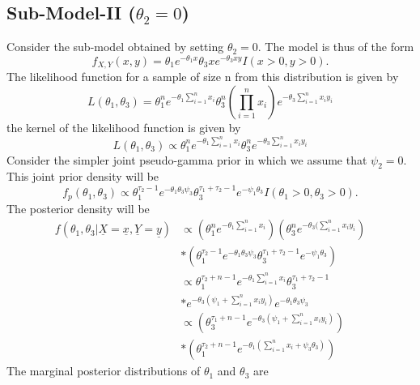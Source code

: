 \documentclass[12pt]{article}    %
\numberwithin{equation}{section}
\begin{document}
\subsection{Sub-Model-II ($\theta_2=0$)}
Consider the sub-model obtained by setting $\theta_2=0$. The model is thus of the form
\begin{equation*}
f_{X,Y}(x,y) = \theta_1e^{-\theta_1x}\theta_3xe^{-\theta_3xy}I(x>0,y>0).
\end{equation*}
The likelihood function for a sample of size n from this distribution is given by
\begin{equation*}
L(\theta_1, \theta_3) = \theta_1^n e^{-\theta_1\sum^n_{i=1}x_i}\theta_3^n(\prod^n_{i=1}x_i) e^{-\theta_3\sum^n_{i=1}x_iy_i}
\end{equation*}
the kernel of the likelihood function is given by
\begin{equation}\label{eq30}
L(\theta_1, \theta_3) \propto \theta_1^n e^{-\theta_1\sum^n_{i=1}x_i}\theta_3^ne^{-\theta_3\sum^n_{i=1}x_iy_i}
\end{equation}
Consider the simpler joint pseudo-gamma prior in which we assume that $\psi_2=0$. This joint prior density will be
\begin{equation}\label{eq31}
f_p(\theta_1, \theta_3) \propto \theta_1^{\tau_2-1}e^{-\theta_1\theta_3\psi_3}\theta_3^{\tau_1+\tau_2-1}e^{-\psi_1\theta_3}I(\theta_1>0, \theta_3>0).
\end{equation}
The posterior density will be
\begin{equation}\label{eq32}
\begin{split}
f(\theta_1,\theta_3|\underline{X}=\underline{x},\underline{Y}=\underline{y}) & \propto (\theta_1^n e^{-\theta_1\sum^n_{i=1}x_i})(\theta_3^n e^{-\theta_3(\sum^n_{i=1}x_iy_i}) \\
& * (\theta_1^{\tau_2-1}e^{-\theta_1\theta_3\psi_3}\theta_3^{\tau_1+\tau_2-1}e^{-\psi_1\theta_3}) \\
& \propto \theta_1^{\tau_2+n-1}e^{-\theta_1\sum^n_{i=1}x_i}\theta_3^{\tau_1+\tau_2-1} \\ &*e^{-\theta_3(\psi_1+\sum^n_{i=1}x_iy_i)}e^{-\theta_1\theta_3\psi_3} \\
& \propto (\theta_3^{\tau_1+n-1}e^{-\theta_3(\psi_1+\sum^n_{i=1}x_iy_i)}) \\
& * (\theta_1^{\tau_2+n-1}e^{-\theta_1(\sum^n_{i=1}x_i+\psi_3\theta_3)})
\end{split}
\end{equation}
The marginal posterior distributions of $\theta_1$ and $\theta_3$ are
\end{document}
